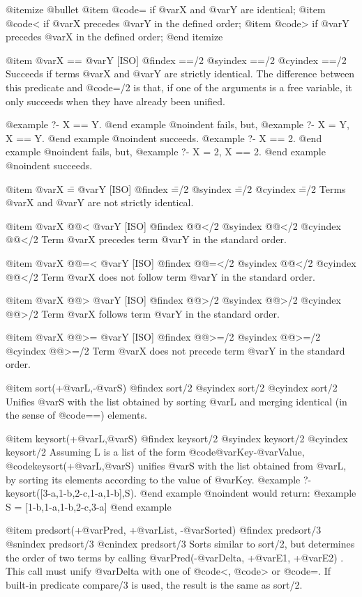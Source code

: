 {{{{@itemize @bullet
@item
@code{=} if @var{X} and @var{Y} are identical;
@item
@code{<} if @var{X} precedes @var{Y} in the defined order;
@item
@code{>} if @var{Y} precedes @var{X} in the defined order;
@end itemize

@item @var{X} == @var{Y} [ISO]
@findex ==/2
@syindex ==/2
@cyindex ==/2
Succeeds if terms @var{X} and @var{Y} are strictly identical. The
difference between this predicate and @code{=/2} is that, if one of the
arguments is a free variable, it only succeeds when they have already
been unified.

@example
?- X == Y.
@end example
@noindent
fails, but,
@example
?- X = Y, X == Y.
@end example
@noindent
succeeds.
@example
?- X == 2.
@end example
@noindent
fails, but,
@example
?- X = 2, X == 2.
@end example
@noindent
succeeds.


@item @var{X} \== @var{Y} [ISO]
@findex \==/2
@syindex \==/2
@cyindex \==/2
Terms @var{X} and @var{Y} are not strictly identical.

@item @var{X} @@< @var{Y} [ISO]
@findex @@</2
@syindex @@</2
@cyindex @@</2
Term @var{X} precedes term @var{Y} in the standard order.

@item @var{X} @@=< @var{Y} [ISO]
@findex @@=</2
@syindex @@</2
@cyindex @@</2
Term @var{X} does not follow term @var{Y} in the standard order.

@item @var{X} @@> @var{Y} [ISO]
@findex @@>/2
@syindex @@>/2
@cyindex @@>/2
Term @var{X} follows term @var{Y} in the standard order.

@item @var{X} @@>= @var{Y} [ISO]
@findex @@>=/2
@syindex @@>=/2
@cyindex @@>=/2
Term @var{X} does not precede term @var{Y} in the standard order.

@item sort(+@var{L},-@var{S})
@findex sort/2
@syindex sort/2
@cyindex sort/2
Unifies @var{S} with the list obtained by sorting @var{L} and  merging
identical (in the sense of @code{==}) elements.

@item keysort(+@var{L},@var{S})
@findex keysort/2
@syindex keysort/2
@cyindex keysort/2
Assuming L is a list of the form @code{@var{Key}-@var{Value}},
@code{keysort(+@var{L},@var{S})} unifies @var{S} with the list obtained
from @var{L}, by sorting its elements according to the value of
@var{Key}.
@example
?- keysort([3-a,1-b,2-c,1-a,1-b],S).
@end example
@noindent
would return:
@example
S = [1-b,1-a,1-b,2-c,3-a]
@end example

@item predsort(+@var{Pred}, +@var{List}, -@var{Sorted})
@findex predsort/3
@snindex predsort/3
@cnindex predsort/3
Sorts similar to sort/2, but determines the order of two terms by
calling @var{Pred}(-@var{Delta}, +@var{E1}, +@var{E2}) . This call must
unify @var{Delta} with one of @code{<}, @code{>} or @code{=}. If
built-in predicate compare/3 is used, the result is the same as
sort/2.

}}}}
